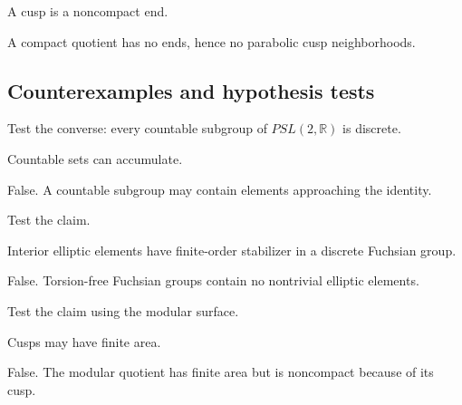 \begin{hint}
A cusp is a noncompact end.
\end{hint}

\begin{solution}
A compact quotient has no ends, hence no parabolic cusp neighborhoods.
\end{solution}

\subsection*{Counterexamples and hypothesis tests}

\begin{exercise}\label{exr:vii35-ped-10}
Test the converse: every countable subgroup of \(PSL(2,\mathbb R)\) is discrete.
\end{exercise}

\begin{hint}
Countable sets can accumulate.
\end{hint}

\begin{solution}
False.  A countable subgroup may contain elements approaching the identity.
\end{solution}

\begin{exercise}\label{exr:vii35-ped-11}
Test the claim.
\end{exercise}

\begin{hint}
Interior elliptic elements have finite-order stabilizer in a discrete Fuchsian group.
\end{hint}

\begin{solution}
False.  Torsion-free Fuchsian groups contain no nontrivial elliptic elements.
\end{solution}

\begin{exercise}\label{exr:vii35-ped-12}
Test the claim using the modular surface.
\end{exercise}

\begin{hint}
Cusps may have finite area.
\end{hint}

\begin{solution}
False.  The modular quotient has finite area but is noncompact because of its cusp.
\end{solution}

